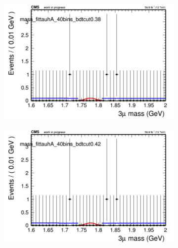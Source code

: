 \begin{figure}[H]
\begin{subfigure}{0.2\textwidth}
        \caption{}
    \end{subfigure}
    \begin{subfigure}{0.2\textwidth}
        \includegraphics[width=\textwidth]{power_law/plots/tauhA/massfit_tauhA_40bins_bdtcut0.38.png}
        \caption{}
    \end{subfigure}
    \begin{subfigure}{0.2\textwidth}
        \includegraphics[width=\textwidth]{power_law/plots/tauhA/massfit_tauhA_40bins_bdtcut0.42.png}
        \caption{}
    \end{subfigure}
    \begin{subfigure}{0.2\textwidth}

\end{subfigure}
\end{figure}

